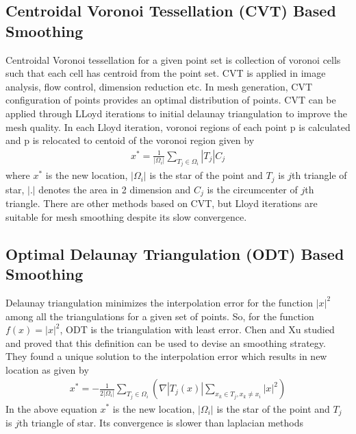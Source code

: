 \subsection{Centroidal Voronoi Tessellation (CVT) Based Smoothing}
Centroidal Voronoi tessellation \cite{cvt} for a given point set is collection of voronoi cells such that each cell has centroid from the point set. CVT is applied in image analysis, flow control, dimension reduction etc. In mesh generation, CVT configuration of points provides an optimal distribution of points. CVT can be applied through LLoyd \cite{lloyd} iterations to initial delaunay triangulation to improve the mesh quality. In each Lloyd iteration, voronoi regions of each point p is calculated and p is relocated to centoid of the voronoi region given by 
\begin{eqnarray}
x^*= \frac{1}{|\Omega_i|} \sum_{T_j \in \Omega_i} |T_j|C_j
\end{eqnarray}
where  $x^*$ is the new location, $|\Omega_i|$ is the star of the point and $T_j$ is $j$th triangle of star, $|.|$ denotes the area in 2 dimension and $C_j$ is the circumcenter of $j$th triangle. There are other methods based on CVT, but Lloyd iterations are suitable for mesh smoothing despite its slow convergence.

\subsection{Optimal Delaunay Triangulation (ODT) Based Smoothing}
Delaunay triangulation minimizes the interpolation error for the function $|x|^2$ among all the triangulations for a given set of points. So, for the function $f(x) = |x|^2$, ODT is the triangulation with least error. Chen and Xu \cite{chen&xu} studied and proved that this definition can be used to devise an smoothing strategy. They found a unique solution to the interpolation error which results in new location as given by
\begin{eqnarray}
x^*=-\frac{1}{2|\Omega_i|} \sum_{T_j \in \Omega_i}(\nabla |T_j(x)| \sum_{x_k \in T_j, x_k \neq x_i} |x|^2)
\end{eqnarray}
In the above equation $x^*$ is the new location, $|\Omega_i|$ is the star of the point and $T_j$ is $j$th triangle of star. Its convergence is slower than laplacian methods 




